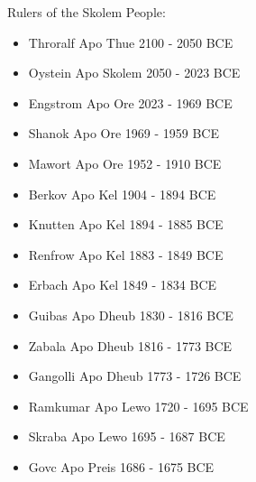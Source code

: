{
  \LARGE
  \normalfont\wedn
Rulers of the Skolem People:

\renewcommand{\labelitemi}{}
\begin{itemize}
\item Throralf Apo Thue 2100 - 2050 BCE
\item Oystein Apo Skolem 2050 - 2023 BCE
\item Engstrom Apo Ore 2023 - 1969 BCE
\item Shanok Apo Ore 1969 - 1959 BCE
\item Mawort Apo Ore 1952 - 1910 BCE
\item Berkov Apo Kel 1904 - 1894 BCE
\item Knutten Apo Kel 1894 - 1885 BCE
\item Renfrow Apo Kel 1883 - 1849 BCE
\item Erbach Apo Kel 1849 - 1834 BCE
\item Guibas Apo Dheub 1830 - 1816 BCE
\item Zabala Apo Dheub 1816 - 1773 BCE
\item Gangolli Apo Dheub 1773 - 1726 BCE
\item Ramkumar Apo Lewo 1720 - 1695 BCE
\item Skraba Apo Lewo 1695 - 1687 BCE
\item Govc Apo Preis 1686 - 1675 BCE
\end{itemize}
}